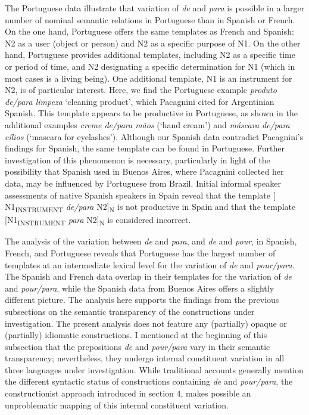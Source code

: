 \documentclass[output=paper]{langsci/langscibook}
\begin{document}
The Portuguese data illustrate that variation of \textit{de} and \textit{para} is possible in a larger number of nominal semantic relations in Portuguese than in Spanish or French. On the one hand, Portuguese offers the same templates as French and Spanish: N2 as a user (object or person) and N2 as a specific purpose of N1. On the other hand, Portuguese provides additional templates, including N2 as a specific time or period of time, and N2 designating a specific determination for N1 (which in most cases is a living being). One additional template, N1 is an instrument for N2, is of particular interest. Here, we find the Portuguese example \textit{produto de/para limpeza} `cleaning product', which Pacagnini cited for Argentinian Spanish. This template appears to be productive in Portuguese, as shown in the additional examples \textit{creme de/para mãos} (`hand cream') and \textit{máscara de\slash para cílios} (`mascara for eyelashes'). Although our Spanish data contradict Pacagnini's findings for Spanish, the same template can be found in Portuguese. Further investigation of this phenomenon is necessary, particularly in light of the possibility that Spanish used in Buenos Aires, where Pacagnini collected her data, may be influenced by Portuguese from Brazil. Initial informal speaker assessments of native Spanish speakers in Spain reveal that the template [ N1\textsubscript{INSTRUMENT} \textit{de/para} N2]\textsubscript{N} is not productive in Spain and that the template [N1\textsubscript{INSTRUMENT} \textit{para} N2]\textsubscript{N} is considered incorrect. 

The analysis of the variation between \textit{de} and \textit{para}, and \textit{de} and \textit{pour}, in Spanish, French, and Portuguese reveals that Portuguese has the largest number of templates at an intermediate lexical level for the variation of \textit{de} and \textit{pour/para}. The Spanish and French data overlap in their templates for the variation of \textit{de} and \textit{pour/para}, while the Spanish data from Buenos Aires \citep{Pacagnini:2003} offers a slightly different picture. The analysis here supports the findings from the previous subsections on the semantic transparency of the constructions under investigation. The present analysis does not feature any (partially) opaque or (partially) idiomatic constructions.
I mentioned at the beginning of this subsection that the prepositions \textit{de} and \textit{pour/para} vary in their semantic transparency; nevertheless, they undergo internal constituent variation in all three languages under investigation. While traditional accounts generally mention the different syntactic status of constructions containing \textit{de} and \textit{pour/para}, the constructionist approach introduced in section 4, makes possible an unproblematic mapping of this internal constituent variation.  
\end{document}
